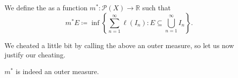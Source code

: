 \documentclass[notoc,notitlepage]{tufte-book}
\begin{document}
\begin{defn}\label{defn:lebesgue_outer_measure}
  We define the  as a function $m^* :
  \mathcal{P}(X) \to \mathbb{R}$ such that
  \begin{equation*}
    m^* E \coloneqq \inf \left\{ \sum_{n=1}^{\infty} \ell(I_n) : E \subseteq
    \bigcup_{n=1}^{\infty} I_n \right\}.
  \end{equation*}
\end{defn}

We cheated a little bit by calling the above an outer measure, so let us now
justify our cheating.

\begin{propo}\label{propo:validity_of_the_lebesgue_outer_measure}
  $m^*$ is indeed an outer measure.
\end{propo}
\end{document}
